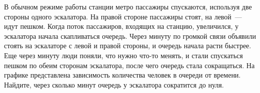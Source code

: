 В обычном режиме работы станции метро пассажиры спускаются, используя две стороны одного эскалатора. На правой стороне пассажиры стоят, на левой~--- идут пешком. Когда поток пассажиров, входящих на станцию, увеличился, у эскалатора начала скапливаться очередь. Через минуту по громкой связи объявили стоять на эскалаторе с левой и правой стороны, и очередь начала расти быстрее. Еще через минуту люди поняли, что нужно что-то менять, и стали спускаться пешком по обеим сторонам эскалатора, после чего очередь стала сокращаться. На графике представлена зависимость количества человек в очереди от времени. Найдите, через сколько минут очередь у эскалатора сократится до нуля.